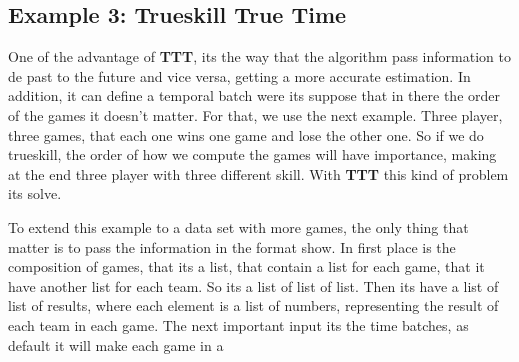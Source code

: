 \documentclass[article]{jss}
\begin{document}
\subsection{Example 3: Trueskill True Time}
One of the advantage of \textbf{TTT}, its the way that the algorithm pass information to de past to the future and vice versa, getting a more accurate estimation. In addition, it can define a temporal batch were its suppose that in there the order of the games it doesn't matter. For that, we use the next example. Three player, three games, that each one wins one game and lose the other one. So if we do trueskill, the order of how we compute the games will have importance, making at the end three player with three different skill. With \textbf{TTT} this kind of problem its solve.



To extend this example to a data set with more games, the only thing that matter is to pass the information in the format show. In first place is the composition of games, that its a list, that contain a list for each game, that it have another list for each team. So its a list of list of list. Then its have a list of list of results, where each element is a list of numbers, representing the result of each team in each game. The next important input its the time batches, as default it will make each game in a 
\end{document}
